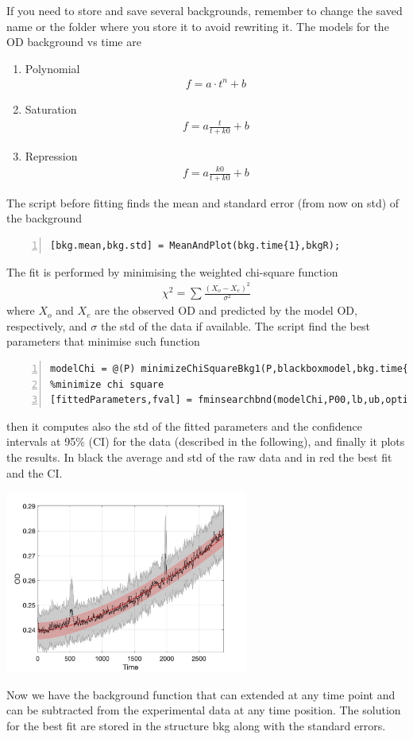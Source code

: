\documentclass{article}
\begin{document}
If you need to store and save several backgrounds, remember to change the saved name or the folder where you store it to avoid rewriting it. The models for the OD background vs time are
\begin{enumerate}
\item Polynomial 
\begin{align}
f = a \cdot t^n + b
\end{align}
\item Saturation 
\begin{align}
f = a \frac{t}{t+k0} +b
\end{align}
\item Repression 
\begin{align}
f = a \frac{k0}{t+k0} +b
\end{align}
\end{enumerate}
The script before fitting finds the mean and standard error (from now on std) of the background
\begin{lstlisting}[frame=single,numbers=left,style=Matlab-Pyglike]
[bkg.mean,bkg.std] = MeanAndPlot(bkg.time{1},bkgR);
\end{lstlisting}
The fit is performed by minimising the weighted chi-square function
\begin{align}
\chi^2 = \sum \frac{(X_o - X_e)^2}{\sigma^2}
\end{align}
where $X_o$ and $X_e$ are the observed OD and predicted by the model OD, respectively, and $\sigma$ the std of the data if available. The script find the best parameters that minimise such function
\begin{lstlisting}[frame=single,numbers=left,style=Matlab-Pyglike]
modelChi = @(P) minimizeChiSquareBkg1(P,blackboxmodel,bkg.time{1},parameters0,Data0);
%minimize chi square
[fittedParameters,fval] = fminsearchbnd(modelChi,P00,lb,ub,options);
\end{lstlisting}
then it computes also the std of the fitted parameters and the confidence intervals at 95\% (CI) for the data (described in the following), and finally it plots the results. In black the average and std of the raw data and in red the best fit and the CI.
\begin{center}
\includegraphics[width=0.6\textwidth]{b1} 
\end{center}
Now we have the background function that can extended at any time point and can be subtracted from the experimental data at any time position. The solution for the best fit are stored in the structure bkg along with the standard errors.
\end{document}
